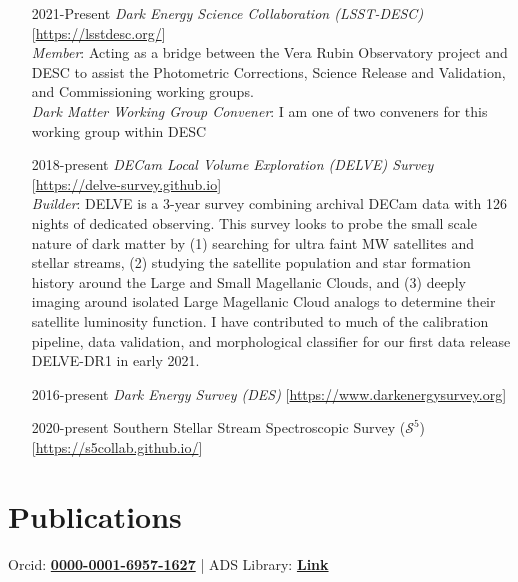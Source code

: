 \documentclass[11pt,letterpaper, sans]{moderncv}        %
\let\oldhref\href
\renewcommand{\href}[2]{\oldhref{#1}{\bfseries#2}}
\begin{document}
\begin{itemize}[itemsep=1pt, leftmargin=65pt]
\begin{itemize}
    \end{itemize}
    \item [2021-Present] \emph{Dark Energy Science Collaboration (LSST-DESC)} [\url{https://lsstdesc.org/}]\\
    \emph{Member}: Acting as a bridge between the Vera Rubin Observatory project and DESC to assist the Photometric Corrections, Science Release and Validation, and Commissioning working groups. \\
    \emph{Dark Matter Working Group Convener}: I am one of two conveners for this working group within DESC
    \item [2018-present] \emph{DECam Local Volume Exploration (DELVE) Survey} [\url{https://delve-survey.github.io}]\\
    \emph{Builder}: DELVE is a 3-year survey combining archival DECam data with 126 nights of dedicated observing. This survey looks to probe the small scale nature of dark matter by (1) searching for ultra faint MW satellites and stellar streams, (2) studying the satellite population and star formation history around the Large and Small Magellanic Clouds, and (3) deeply imaging around isolated Large Magellanic Cloud analogs to determine their satellite luminosity function. I have contributed to much of the calibration pipeline, data validation, and morphological classifier for our first data release DELVE-DR1 in early 2021. 
    
    \item [2016-present] \emph{Dark Energy Survey (DES)} [\url{https://www.darkenergysurvey.org}]\\
    \item [2020-present] Southern Stellar Stream Spectroscopic Survey ($\mathcal{S}^5$) [\url{https://s5collab.github.io/}]\\
\end{itemize}
\vspace*{-4mm}

\section{Publications}
\hspace{1.6in} Orcid: \href{https://orcid.org/0000-0001-6957-1627}{0000-0001-6957-1627} | ADS Library: \href{https://ui.adsabs.harvard.edu/user/libraries/rBhHJF5MTWqIJuR0n-PNKA}{Link}
%

\newpage
\end{document}
